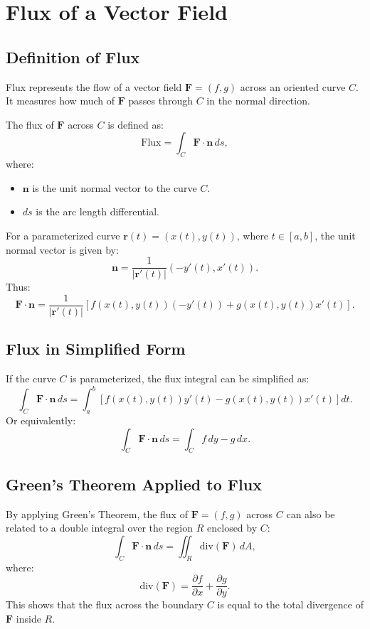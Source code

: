 \documentclass{report}
\begin{document}
\section{Flux of a Vector Field}

\subsection*{Definition of Flux}
Flux represents the flow of a vector field \( \mathbf{F} = (f, g) \) across an oriented curve \( C \). It measures how much of \( \mathbf{F} \) passes through \( C \) in the normal direction.

The flux of \( \mathbf{F} \) across \( C \) is defined as:
\[
\text{Flux} = \int_C \mathbf{F} \cdot \mathbf{n} \, ds,
\]
where:
\begin{itemize}
    \item \( \mathbf{n} \) is the unit normal vector to the curve \( C \).
    \item \( ds \) is the arc length differential.
\end{itemize}

For a parameterized curve \( \mathbf{r}(t) = (x(t), y(t)) \), where \( t \in [a, b] \), the unit normal vector is given by:
\[
\mathbf{n} = \frac{1}{|\mathbf{r}'(t)|} (-y'(t), x'(t)).
\]
Thus:
\[
\mathbf{F} \cdot \mathbf{n} = \frac{1}{|\mathbf{r}'(t)|} \left[f(x(t), y(t)) (-y'(t)) + g(x(t), y(t)) x'(t)\right].
\]



\subsection*{Flux in Simplified Form}
If the curve \( C \) is parameterized, the flux integral can be simplified as:
\[
\int_C \mathbf{F} \cdot \mathbf{n} \, ds = \int_a^b \left[f(x(t), y(t)) y'(t) - g(x(t), y(t)) x'(t)\right] dt.
\]
Or equivalently:
\[
\int_C \mathbf{F} \cdot \mathbf{n} \, ds = \int_C f \, dy - g \, dx.
\]



\subsection*{Green's Theorem Applied to Flux}
By applying Green's Theorem, the flux of \( \mathbf{F} = (f, g) \) across \( C \) can also be related to a double integral over the region \( R \) enclosed by \( C \):
\[
\int_C \mathbf{F} \cdot \mathbf{n} \, ds = \iint_R \text{div}(\mathbf{F}) \, dA,
\]
where:
\[
\text{div}(\mathbf{F}) = \frac{\partial f}{\partial x} + \frac{\partial g}{\partial y}.
\]
This shows that the flux across the boundary \( C \) is equal to the total divergence of \( \mathbf{F} \) inside \( R \).
\end{document}
